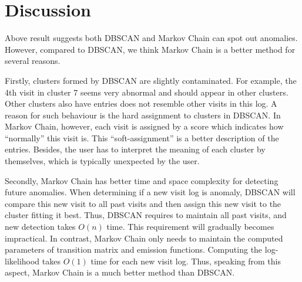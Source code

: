\section{Discussion}
\label{sec:discuss}
Above result suggests both DBSCAN and Markov Chain can spot out anomalies. However, compared to DBSCAN, we think Markov Chain is a better method for several reasons. 

Firstly, clusters formed by DBSCAN are slightly contaminated. For example, the 4th visit in cluster 7 seems very abnormal and should appear in other clusters. Other clusters also have entries does not resemble other visits in this log. A reason for such behaviour is the hard assignment to clusters in DBSCAN. In Markov Chain, however, each visit is assigned by a score which indicates how ``normally'' this visit is. This ``soft-assignment'' is a better description of the entries. Besides, the user has to interpret the meaning of each cluster by themselves, which is typically unexpected by the user.

Secondly, Markov Chain has better time and space complexity for detecting future anomalies. When determining if a new visit log is anomaly, DBSCAN will compare this new visit to all past visits and then assign this new visit to the cluster fitting it best. Thus, DBSCAN requires to maintain all past visits, and new detection takes $O(n)$ time. This requirement will gradually becomes impractical. In contrast, Markov Chain only needs to maintain the computed parameters of transition matrix and emission functions. Computing the log-likelihood takes $O(1)$ time for each new visit log. Thus, speaking from this aspect, Markov Chain is a much better method than DBSCAN.